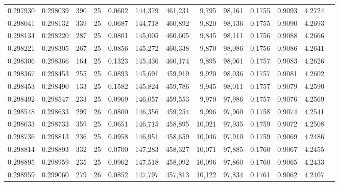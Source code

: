 \begin{tabular}{rrrrrrrrrrrrr}
0.297930 & 0.298039 &   390 &  25 &                                     0.0602 & 144,379 & 461,231 &   9,795 &  98,161 & 0.1755 & 0.9093 & 4.2724 \\
0.298041 & 0.298132 &   339 &  25 &                                     0.0687 & 144,718 & 460,892 &   9,820 &  98,136 & 0.1755 & 0.9090 & 4.2693 \\
0.298134 & 0.298220 &   287 &  25 &                                     0.0801 & 145,005 & 460,605 &   9,845 &  98,111 & 0.1756 & 0.9088 & 4.2666 \\
0.298221 & 0.298305 &   267 &  25 &                                     0.0856 & 145,272 & 460,338 &   9,870 &  98,086 & 0.1756 & 0.9086 & 4.2641 \\
0.298306 & 0.298366 &   164 &  25 &                                     0.1323 & 145,436 & 460,174 &   9,895 &  98,061 & 0.1757 & 0.9083 & 4.2626 \\
0.298367 & 0.298453 &   255 &  25 &                                     0.0893 & 145,691 & 459,919 &   9,920 &  98,036 & 0.1757 & 0.9081 & 4.2602 \\
0.298453 & 0.298490 &   133 &  25 &                                     0.1582 & 145,824 & 459,786 &   9,945 &  98,011 & 0.1757 & 0.9079 & 4.2590 \\
0.298492 & 0.298547 &   233 &  25 &                                     0.0969 & 146,057 & 459,553 &   9,970 &  97,986 & 0.1757 & 0.9076 & 4.2569 \\
0.298548 & 0.298633 &   299 &  26 &                                     0.0800 & 146,356 & 459,254 &   9,996 &  97,960 & 0.1758 & 0.9074 & 4.2541 \\
0.298633 & 0.298733 &   359 &  25 &                                     0.0651 & 146,715 & 458,895 &  10,021 &  97,935 & 0.1759 & 0.9072 & 4.2508 \\
0.298736 & 0.298813 &   236 &  25 &                                     0.0958 & 146,951 & 458,659 &  10,046 &  97,910 & 0.1759 & 0.9069 & 4.2486 \\
0.298814 & 0.298893 &   332 &  25 &                                     0.0700 & 147,283 & 458,327 &  10,071 &  97,885 & 0.1760 & 0.9067 & 4.2455 \\
0.298895 & 0.298959 &   235 &  25 &                                     0.0962 & 147,518 & 458,092 &  10,096 &  97,860 & 0.1760 & 0.9065 & 4.2433 \\
0.298959 & 0.299060 &   279 &  26 &                                     0.0852 & 147,797 & 457,813 &  10,122 &  97,834 & 0.1761 & 0.9062 & 4.2407 \\

\end{tabular}
